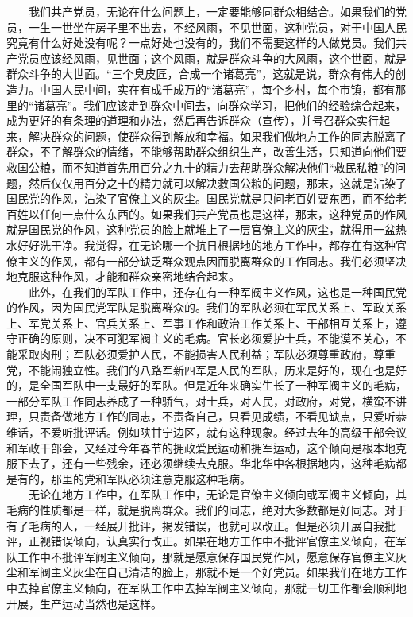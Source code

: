 \documentclass[cn,11pt,chinese]{elegantbook}
\begin{document}
　　我们共产党员，无论在什么问题上，一定要能够同群众相结合。如果我们的党员，一生一世坐在房子里不出去，不经风雨，不见世面，这种党员，对于中国人民究竟有什么好处没有呢？一点好处也没有的，我们不需要这样的人做党员。我们共产党员应该经风雨，见世面；这个风雨，就是群众斗争的大风雨，这个世面，就是群众斗争的大世面。“三个臭皮匠，合成一个诸葛亮”，这就是说，群众有伟大的创造力。中国人民中间，实在有成千成万的“诸葛亮”，每个乡村，每个市镇，都有那里的“诸葛亮”。我们应该走到群众中间去，向群众学习，把他们的经验综合起来，成为更好的有条理的道理和办法，然后再告诉群众（宣传），并号召群众实行起来，解决群众的问题，使群众得到解放和幸福。如果我们做地方工作的同志脱离了群众，不了解群众的情绪，不能够帮助群众组织生产，改善生活，只知道向他们要救国公粮，而不知道首先用百分之九十的精力去帮助群众解决他们“救民私粮”的问题，然后仅仅用百分之十的精力就可以解决救国公粮的问题，那末，这就是沾染了国民党的作风，沾染了官僚主义的灰尘。国民党就是只问老百姓要东西，而不给老百姓以任何一点什么东西的。如果我们共产党员也是这样，那末，这种党员的作风就是国民党的作风，这种党员的脸上就堆上了一层官僚主义的灰尘，就得用一盆热水好好洗干净。我觉得，在无论哪一个抗日根据地的地方工作中，都存在有这种官僚主义的作风，都有一部分缺乏群众观点因而脱离群众的工作同志。我们必须坚决地克服这种作风，才能和群众亲密地结合起来。\\
　　此外，在我们的军队工作中，还存在有一种军阀主义作风，这也是一种国民党的作风，因为国民党军队是脱离群众的。我们的军队必须在军民关系上、军政关系上、军党关系上、官兵关系上、军事工作和政治工作关系上、干部相互关系上，遵守正确的原则，决不可犯军阀主义的毛病。官长必须爱护士兵，不能漠不关心，不能采取肉刑；军队必须爱护人民，不能损害人民利益；军队必须尊重政府，尊重党，不能闹独立性。我们的八路军新四军是人民的军队，历来是好的，现在也是好的，是全国军队中一支最好的军队。但是近年来确实生长了一种军阀主义的毛病，一部分军队工作同志养成了一种骄气，对士兵，对人民，对政府，对党，横蛮不讲理，只责备做地方工作的同志，不责备自己，只看见成绩，不看见缺点，只爱听恭维话，不爱听批评话。例如陕甘宁边区，就有这种现象。经过去年的高级干部会议和军政干部会，又经过今年春节的拥政爱民运动和拥军运动，这个倾向是根本地克服下去了，还有一些残余，还必须继续去克服。华北华中各根据地内，这种毛病都是有的，那里的党和军队必须注意克服这种毛病。\\
　　无论在地方工作中，在军队工作中，无论是官僚主义倾向或军阀主义倾向，其毛病的性质都是一样，就是脱离群众。我们的同志，绝对大多数都是好同志。对于有了毛病的人，一经展开批评，揭发错误，也就可以改正。但是必须开展自我批评，正视错误倾向，认真实行改正。如果在地方工作中不批评官僚主义倾向，在军队工作中不批评军阀主义倾向，那就是愿意保存国民党作风，愿意保存官僚主义灰尘和军阀主义灰尘在自己清洁的脸上，那就不是一个好党员。如果我们在地方工作中去掉官僚主义倾向，在军队工作中去掉军阀主义倾向，那就一切工作都会顺利地开展，生产运动当然也是这样。\\
\end{document}
